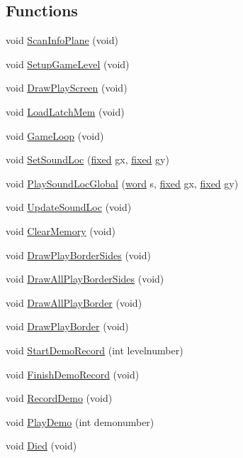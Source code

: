 \subsection*{Functions}
\begin{DoxyCompactItemize}
\item 
void \hyperlink{WL__GAME_8C_a6bcecf9f4e1aed0d5a8de0e3395b73e7}{ScanInfoPlane} (void)
\item 
void \hyperlink{WL__GAME_8C_a272fa7f65051688198cb04c666d9977a}{SetupGameLevel} (void)
\item 
void \hyperlink{WL__GAME_8C_ad8f8ba380685262789e9d6931e35e34a}{DrawPlayScreen} (void)
\item 
void \hyperlink{WL__GAME_8C_a872a52095cf999d5cf5b93deac17193a}{LoadLatchMem} (void)
\item 
void \hyperlink{WL__GAME_8C_aceb580a0e9c038f9f4a99672883b287a}{GameLoop} (void)
\item 
void \hyperlink{WL__GAME_8C_a70fb4c23b70cb34ed1f17005a6279d97}{SetSoundLoc} (\hyperlink{WL__DEF_8H_aaf54715c9b83afe8794059fcf5fd5e7e}{fixed} gx, \hyperlink{WL__DEF_8H_aaf54715c9b83afe8794059fcf5fd5e7e}{fixed} gy)
\item 
void \hyperlink{WL__GAME_8C_ac828a2af8db4f7ce66a84a69313e37ef}{PlaySoundLocGlobal} (\hyperlink{ID__HEAD_8H_abad51e07ab6d26bec9f1f786c8d65bcd}{word} s, \hyperlink{WL__DEF_8H_aaf54715c9b83afe8794059fcf5fd5e7e}{fixed} gx, \hyperlink{WL__DEF_8H_aaf54715c9b83afe8794059fcf5fd5e7e}{fixed} gy)
\item 
void \hyperlink{WL__GAME_8C_a616d397cb4e4bb994034cf07913567fc}{UpdateSoundLoc} (void)
\item 
void \hyperlink{WL__GAME_8C_aef10ed8266c6a98e92c5d6543e7035d6}{ClearMemory} (void)
\item 
void \hyperlink{WL__GAME_8C_a073ed1640a6260fc596f595004745af5}{DrawPlayBorderSides} (void)
\item 
void \hyperlink{WL__GAME_8C_a1b9ab4e752bcb2c76b53d7fa2390c3e0}{DrawAllPlayBorderSides} (void)
\item 
void \hyperlink{WL__GAME_8C_aa703cd8f27efe292d32fb1ed8ae14004}{DrawAllPlayBorder} (void)
\item 
void \hyperlink{WL__GAME_8C_ade09a6750662d5cca8156a38ae0a4b7a}{DrawPlayBorder} (void)
\item 
void \hyperlink{WL__GAME_8C_aa0a446728a2fd029517b950396faaf05}{StartDemoRecord} (int levelnumber)
\item 
void \hyperlink{WL__GAME_8C_a51036fd961a852da0bce3844c7f636bb}{FinishDemoRecord} (void)
\item 
void \hyperlink{WL__GAME_8C_aad40e6bfb5d6c51cef4fb25993b309bb}{RecordDemo} (void)
\item 
void \hyperlink{WL__GAME_8C_a55c9fa06b5f7b6dc6805e3721a15922a}{PlayDemo} (int demonumber)
\item 
void \hyperlink{WL__GAME_8C_a27540b39d401cbea76d1dc2d5d701736}{Died} (void)
\end{DoxyCompactItemize}
